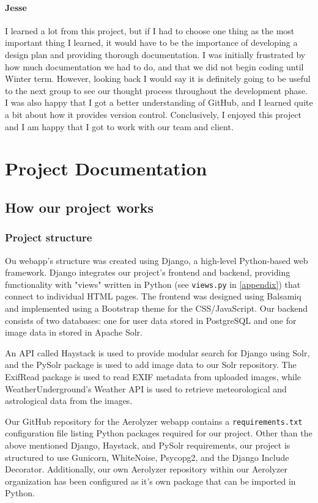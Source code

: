 \documentclass[onecolumn, draftclsnofoot,10pt, compsoc]{IEEEtran}
\begin{document}
\begin{flushleft}
\paragraph{Jesse}
I learned a lot from this project, but if I had to choose one thing as the most important thing I learned, it would have to be the importance of developing a design plan and providing thorough documentation. I was initially frustrated by how much documentation we had to do, and that we did not begin coding until Winter term. However, looking back I would say it is definitely going to be useful to the next group to see our thought process throughout the development phase. I was also happy that I got a better understanding of GitHub, and I learned quite a bit about how it provides version control. Conclusively, I enjoyed this project and I am happy that I got to work with our team and client.
 
\clearpage
\clearpage
 
\section{Project Documentation}
\subsection{How our project works}
\subsubsection{Project structure}
Ou webapp's structure was created using Django, a high-level Python-based web framework. Django integrates our project's frontend and backend, providing functionality with "views" written in Python (see \texttt{views.py} in \ref{appendix}) that connect to individual HTML pages. The frontend was designed using Balsamiq and implemented using a Bootstrap theme for the CSS/JavaScript. Our backend consists of two databases: one for user data stored in PostgreSQL and one for image data in stored in Apache Solr. 
 
An API called Haystack is used to provide modular search for Django using Solr, and the PySolr package is used to add image data to our Solr repository. The ExifRead package is used to read EXIF metadata from uploaded images, while WeatherUnderground's Weather API is used to retrieve meteorological and astrological data from the images. 
 
Our GitHub repository for the Aerolyzer webapp contains a \texttt{requirements.txt} configuration file listing Python packages required for our project. Other than the above mentioned Django, Haystack, and PySolr requirements, our project is structured to use Gunicorn, WhiteNoise, Psycopg2, and the Django Include Decorator. Additionally, our own Aerolyzer repository within our Aerolyzer organization has been configured as it's own package that can be imported in Python.
 

\end{flushleft}
\end{document}
